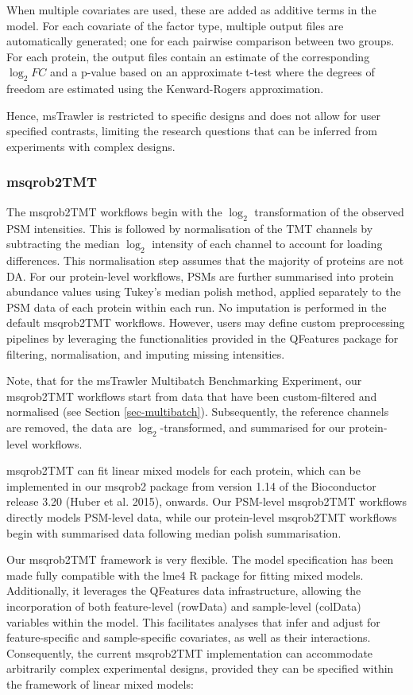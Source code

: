\documentclass[
  letterpaper,
  DIV=11,
  numbers=noendperiod]{scrartcl}
\begin{document}
When multiple covariates are used, these are added as additive terms in
the model. For each covariate of the factor type, multiple output files
are automatically generated; one for each pairwise comparison between
two groups. For each protein, the output files contain an estimate of
the corresponding \(\log_2 FC\) and a p-value based on an approximate
t-test where the degrees of freedom are estimated using the
Kenward-Rogers approximation.

Hence, msTrawler is restricted to specific designs and does not allow
for user specified contrasts, limiting the research questions that can
be inferred from experiments with complex designs.

\subsubsection{msqrob2TMT}

The msqrob2TMT workflows begin with the \(\log_2\) transformation of the
observed PSM intensities. This is followed by normalisation of the TMT
channels by subtracting the median \(\log_2\) intensity of each channel
to account for loading differences. This normalisation step assumes that
the majority of proteins are not DA. For our protein-level workflows,
PSMs are further summarised into protein abundance values using Tukey's
median polish method, applied separately to the PSM data of each protein
within each run. No imputation is performed in the default msqrob2TMT
workflows. However, users may define custom preprocessing pipelines by
leveraging the functionalities provided in the QFeatures package for
filtering, normalisation, and imputing missing intensities.

Note, that for the msTrawler Multibatch Benchmarking Experiment, our
msqrob2TMT workflows start from data that have been custom-filtered and
normalised (see Section \ref{sec-multibatch}). Subsequently, the
reference channels are removed, the data are \(\log_2\)-transformed, and
summarised for our protein-level workflows.

msqrob2TMT can fit linear mixed models for each protein, which can be
implemented in our msqrob2 package from version 1.14 of the Bioconductor
release 3.20 (Huber et al. 2015), onwards. Our PSM-level msqrob2TMT
workflows directly models PSM-level data, while our protein-level
msqrob2TMT workflows begin with summarised data following median polish
summarisation.

Our msqrob2TMT framework is very flexible. The model specification has
been made fully compatible with the lme4 R package for fitting mixed
models. Additionally, it leverages the QFeatures data infrastructure,
allowing the incorporation of both feature-level (rowData) and
sample-level (colData) variables within the model. This facilitates
analyses that infer and adjust for feature-specific and sample-specific
covariates, as well as their interactions. Consequently, the current
msqrob2TMT implementation can accommodate arbitrarily complex
experimental designs, provided they can be specified within the
framework of linear mixed models:
\end{document}
